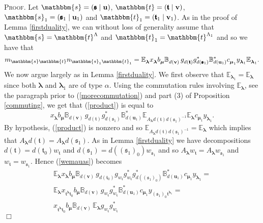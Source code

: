 \documentclass[10pt,a4,twoside,hidelinks,rm]{article}
\newcommand{\BB}{\mathbb{B}}
\newcommand\es{\mathbbm{s}}
\newcommand\et{\mathbbm{t}}
\newcommand\bu{\mathbf{u}}
\newcommand\bv{\mathbf{v}}
\newcommand{\bT}{\pmb{\mathfrak{t}}}
\newcommand{\Bs}{\pmb{\mathfrak{s}}}
\newcommand\blambda{{\boldsymbol\lambda}}
\newcommand\be{\mathbb{E}}
\newcommand\bmu{{\boldsymbol\mu}}
\theoremstyle{plain}
\newenvironment{demo}
{\textsc{Proof.}} {\quad \hfill $\Box$}
\begin{document}
\begin{demo}
Let $\es = (\Bs \mid \bu) $, $ \et = (\bT \mid \bv) $, 
$\es_1 = (\Bs_1 \mid \bu_1) $ and $ \et_1 = (\bT_1 \mid \bv_1) $.
As in the proof of Lemma {\ref{firstduality}}, we can 
without loss of generality assume that $ \es = \et^{\Lambda} $ and
$ \et_1 = \et^{\Lambda_1} $ and so we have that 
\begin{equation}\label{product}
  m_{\es \et } n_{ \es _1 \et_1     } =
 { \be}^{}_{\blambda} x^{}_{\blambda} b^{}_{\bmu}\BB^{}_{d(\bv)}  \,
g^{}_{d(\bT)}
g_{d(\Bs_1)}^{\ast}  
\BB_{d(\bu_1)}^{\ast}  c^{}_{\bmu_1} y^{}_{\blambda_1} { \be}^{}_{\blambda_1}. 
\end{equation}
We now argue largely as in Lemma {\ref{firstduality}}.  
We first observe that $ { \be}^{}_{\blambda_1} = { \be}^{}_{\blambda} $
since both $ \blambda$ and $ \blambda_1 $ are of type $ \alpha$.
Using the commutation rules
involving $ { \be}^{}_{\blambda} $, see the paragraph prior to (\ref{morecommutation})
and part (3) of Proposition \ref{commuting}, 
we get that (\ref{product}) is equal to
\begin{equation}\label{wemauas}
 x^{}_{\blambda} b^{}_{\bmu}\BB^{}_{d(\bv)}  \,
g^{}_{d(\bT)}
g_{d(\Bs_1)}^{\ast}  
\BB_{d(\bu_1)}^{\ast}  
{ \be}^{}_{A_{\blambda} d(\bT) d(\Bs_1)^{-1} } { \be}^{}_{\blambda} c^{}_{\bmu_1}
y^{}_{\blambda_1}. 
\end{equation}
By hypothesis, (\ref{product}) is nonzero and so 
$ { \be}^{}_{A_{\blambda} d(\bT) d(\Bs_1)^{-1} }=  { \be}^{}_{\blambda} $ 
which implies that 
$ A_{\blambda} d(\bT) = A_{\blambda} d({\Bs}_1) $.
As in Lemma {\ref{firstduality}} we have decompositions
$ d(\bT ) = d(\bT_0) w_{\bT} $ and
$ d(\Bs_1 ) = d((\Bs_1)_0) w_{\Bs_1} $ 
and so 
$ A_{\blambda} w_{\bT} = A_{\blambda} w_{\Bs_1} $ and
$  w_{\bT} = w_{\Bs_1} $.
Hence (\ref{wemauas}) becomes
\begin{equation}\label{68becomes}
\begin{split}
{ \be}^{}_{\blambda}  x^{}_{\blambda} b^{}_{\bmu}\BB^{}_{d(\bv)}  \,
g^{}_{d(\bT_0)} g^{}_{  w_{\bT} } g^{\ast}_{  w_{\bT} }  
g_{d((\Bs_1)_0)}^{\ast}  
\BB_{d(\bu_1)}^{\ast} c^{}_{\bmu_1}  
y^{}_{\blambda_1}= \\
{ \be}^{}_{\blambda}   x^{}_{\bT^{\blambda}  \bT_0} b^{}_{\bmu}\BB^{}_{d(\bv)}  \,
 g^{}_{  w_{\bT} } g^{\ast}_{  w_{\bT} }  
\BB_{d(\bu_1)}^{\ast} c^{}_{\bmu_1}  
y^{}_{  (\Bs_1)_0   \bT^{\blambda_1 }} =\\
  x^{}_{\bT^{\blambda}  \bT_0} b^{}_{\bmu}\BB^{}_{d(\bv)}  \,
{ \be}^{}_{\blambda } g^{}_{  w_{\bT} } g^{\ast}_{  w_{\bT} }  

\end{split}
\end{equation}
\end{demo}
\end{document}
